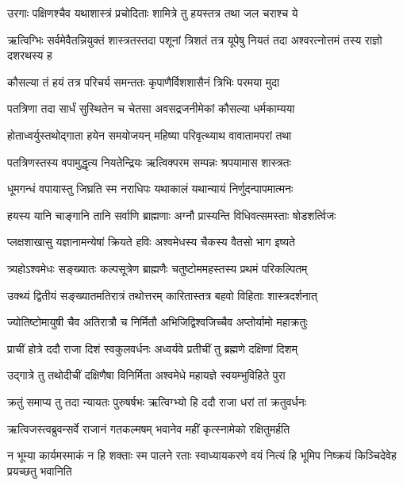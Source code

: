 \twolineshloka
{उरगाः पक्षिणश्चैव यथाशास्त्रं प्रचोदिताः}
{शामित्रे तु हयस्तत्र तथा जल चराश्च ये} %

\threelineshloka
{ऋत्विग्भिः सर्वमेवैतन्नियुक्तं शास्त्रतस्तदा}
{पशूनां त्रिशतं तत्र यूपेषु नियतं तदा}
{अश्वरत्नोत्तमं तस्य राज्ञो दशरथस्य ह} %

\twolineshloka
{कौसल्या तं हयं तत्र परिचर्य समन्ततः}
{कृपाणैर्विशशासैनं त्रिभिः परमया मुदा} %

\twolineshloka
{पतत्रिणा तदा सार्धं सुस्थितेन च चेतसा}
{अवसद्रजनीमेकां कौसल्या धर्मकाम्यया} %

\twolineshloka
{होताध्वर्युस्तथोद्गाता हयेन समयोजयन्}
{महिष्या परिवृत्थ्याथ वावातामपरां तथा} %

\twolineshloka
{पतत्रिणस्तस्य वपामुद्धृत्य नियतेन्द्रियः}
{ऋत्विक्परम सम्पन्नः श्रपयामास शास्त्रतः} %

\twolineshloka
{धूमगन्धं वपायास्तु जिघ्रति स्म नराधिपः}
{यथाकालं यथान्यायं निर्णुदन्पापमात्मनः} %

\twolineshloka
{हयस्य यानि चाङ्गानि तानि सर्वाणि ब्राह्मणाः}
{अग्नौ प्रास्यन्ति विधिवत्समस्ताः षोडशर्त्विजः} %

\twolineshloka
{प्लक्षशाखासु यज्ञानामन्येषां क्रियते हविः}
{अश्वमेधस्य चैकस्य वैतसो भाग इष्यते} %

\twolineshloka
{त्र्यहोऽश्वमेधः सङ्ख्यातः कल्पसूत्रेण ब्राह्मणैः}
{चतुष्टोममहस्तस्य प्रथमं परिकल्पितम्} %

\twolineshloka
{उक्थ्यं द्वितीयं सङ्ख्यातमतिरात्रं तथोत्तरम्}
{कारितास्तत्र बहवो विहिताः शास्त्रदर्शनात्} %

\twolineshloka
{ज्योतिष्टोमायुषी चैव अतिरात्रौ च निर्मितौ}
{अभिजिद्विश्वजिच्चैव अप्तोर्यामो महाक्रतुः} %

\twolineshloka
{प्राचीं होत्रे ददौ राजा दिशं स्वकुलवर्धनः}
{अध्वर्यवे प्रतीचीं तु ब्रह्मणे दक्षिणां दिशम्} %

\twolineshloka
{उद्गात्रे तु तथोदीचीं दक्षिणैषा विनिर्मिता}
{अश्वमेधे महायज्ञे स्वयम्भुविहिते पुरा} %

\twolineshloka
{क्रतुं समाप्य तु तदा न्यायतः पुरुषर्षभः}
{ऋत्विग्भ्यो हि ददौ राजा धरां तां क्रतुवर्धनः} %

\twolineshloka
{ऋत्विजस्त्वब्रुवन्सर्वे राजानं गतकल्मषम्}
{भवानेव महीं कृत्स्नामेको रक्षितुमर्हति} %

\threelineshloka
{न भूम्या कार्यमस्माकं न हि शक्ताः स्म पालने}
{रताः स्वाध्यायकरणे वयं नित्यं हि भूमिप}
{निष्क्रयं किञ्चिदेवेह प्रयच्छतु भवानिति} %

